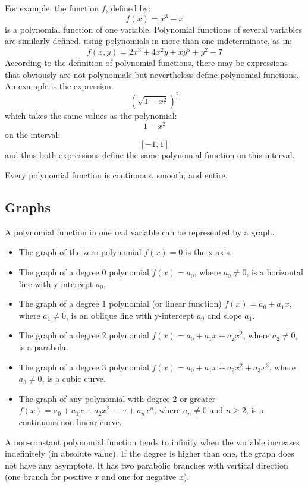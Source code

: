 For example, the function $f$, defined by:
\[
f(x) = x^3 - x
\]
is a polynomial function of one variable. Polynomial functions of several variables are
similarly defined, using polynomials in more than one indeterminate, as in:
\[
f(x, y) = 2x^3 + 4x^2 y + xy^5 + y^2 - 7
\]
According to the definition of polynomial functions, there may be expressions that
obviously are not polynomials but nevertheless define polynomial functions. An example is
the expression:
\[
\left(\sqrt{1 - x^2}\right)^2
\]
which takes the same values as the polynomial:
\[
1 - x^2
\]
on the interval:
\[
[-1, 1]
\]
and thus both expressions define the same polynomial function on this interval.

Every polynomial function is continuous, smooth, and entire.

\subsection{Graphs}
\label{sss:grap-e870}

A polynomial function in one real variable can be represented by a graph.

\begin{itemize}
    \item The graph of the zero polynomial $f(x) = 0$ is the x-axis.
    \item The graph of a degree 0 polynomial $f(x) = a_0$, where $a_0 \neq 0$, is a horizontal line with y-intercept $a_0$.
    \item The graph of a degree 1 polynomial (or linear function) $f(x) = a_0 + a_1 x$, where $a_1 \neq 0$, is an oblique line with y-intercept $a_0$ and slope $a_1$.
    \item The graph of a degree 2 polynomial $f(x) = a_0 + a_1 x + a_2 x^2$, where $a_2 \neq 0$, is a parabola.
    \item The graph of a degree 3 polynomial $f(x) = a_0 + a_1 x + a_2 x^2 + a_3 x^3$, where $a_3 \neq 0$, is a cubic curve.
    \item The graph of any polynomial with degree 2 or greater $f(x) = a_0 + a_1 x + a_2 x^2 + \cdots + a_n x^n$, where $a_n \neq 0$ and $n \geq 2$, is a continuous non-linear curve.
\end{itemize}

A non-constant polynomial function tends to infinity when the variable increases indefinitely (in absolute value). If the degree is higher than one, the graph does not have any asymptote. It has two parabolic branches with vertical direction (one branch for positive $x$ and one for negative $x$).

